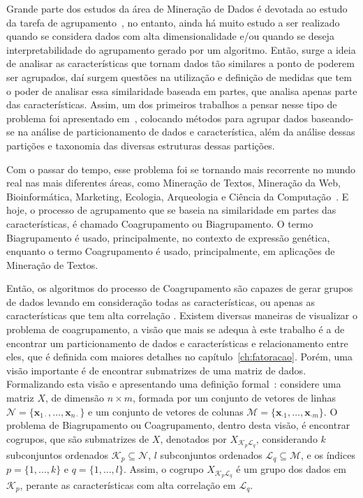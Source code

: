 \documentclass[
    12pt,                %
    oneside,            %
    a4paper,            %
    english,            %
    brazil                %
    ]{abntex2ppgsi}
\begin{document}
Grande parte dos estudos da área de Mineração de Dados é devotada ao estudo da tarefa de agrupamento~\cite{Han2011}, no entanto, ainda há muito estudo a ser realizado quando se considera dados com alta dimensionalidade e/ou quando se deseja interpretabilidade do agrupamento gerado por um algoritmo.
Então, surge a ideia de analisar as características que tornam dados tão similares a ponto de poderem ser agrupados, daí surgem questões na utilização e definição de medidas que tem o poder de analisar essa similaridade baseada em partes, que analisa apenas parte das características.
Assim, um dos primeiros trabalhos a pensar nesse tipo de problema foi apresentado em~, colocando métodos para agrupar dados baseando-se na análise de particionamento de dados e característica, além da análise dessas partições e taxonomia das diversas estruturas dessas partições.

Com o passar do tempo, esse problema foi se tornando mais recorrente no mundo real nas mais diferentes áreas, como Mineração de Textos, Mineração da Web, Bioinformática, Marketing, Ecologia, Arqueologia e Ciência da Computação~\cite{Govaert2013}.
E hoje, o processo de agrupamento que se baseia na similaridade em partes das características, é chamado Coagrupamento ou Biagrupamento.
O termo Biagrupamento é usado, principalmente, no contexto de expressão genética, enquanto o termo Coagrupamento é usado, principalmente, em aplicações de Mineração de Textos.

Então, os algoritmos do processo de Coagrupamento são capazes de gerar grupos de dados levando em consideração todas as características, ou apenas as características que tem alta correlação \cite{Franca2010,Madeira2004}.
Existem diversas maneiras de visualizar o problema de coagrupamento, a visão que mais se adequa à este trabalho é a de encontrar um particionamento de dados e características e relacionamento entre eles, que é definida com maiores detalhes no capítulo~\ref{ch:fatoracao}.
Porém, uma visão importante é de encontrar submatrizes de uma matriz de dados.
Formalizando esta visão e apresentando uma definição formal~\cite{Madeira2004}: considere uma matriz $X$, de dimensão $n \times m$, formada por um conjunto de vetores de linhas $\mathcal{N} = \{ \mathbf{x}_{1 \cdot}, \dots, \mathbf{x}_{n \cdot} \}$ e um conjunto de vetores de colunas $\mathcal{M} = \{ \mathbf{x}_{\cdot 1}, \dots, \mathbf{x}_{\cdot m} \}$.
O problema de Biagrupamento ou Coagrupamento, dentro desta visão, é encontrar cogrupos, que são submatrizes de $X$, denotados por $X_{\mathcal{K}_p \mathcal{L}_q}$, considerando $k$ subconjuntos ordenados $\mathcal{K}_p \subseteq \mathcal{N}$, $l$ subconjuntos ordenados $\mathcal{L}_q \subseteq \mathcal{M}$, e os índices $p = \{ 1, \dots, k\}$ e $q = \{1, \dots, l\}$.
Assim, o cogrupo $X_{\mathcal{K}_p \mathcal{L}_q}$ é um grupo dos dados em $\mathcal{K}_p$, perante as características com alta correlação em $\mathcal{L}_q$.
\end{document}
